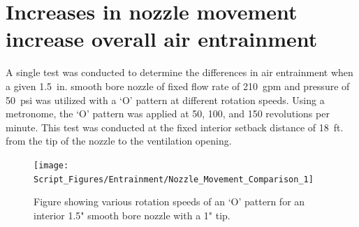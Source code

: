 \documentclass[12pt,oneside]{book}
\begin{document}




\section{Increases in nozzle movement increase overall air entrainment}

A single test was conducted to determine the differences in air entrainment when a given 1.5~in. smooth bore nozzle of fixed flow rate of 210~gpm and pressure of 50~psi was utilized with a `O' pattern at different rotation speeds. Using a metronome, the `O' pattern was applied at 50, 100, and 150 revolutions per minute. This test was conducted at the fixed interior setback distance of 18~ft. from the tip of the nozzle to the ventilation opening.

\begin{figure}[!ht]
	\centering
	\texttt{[image: Script\_Figures/Entrainment/Nozzle\_Movement\_Comparison\_1]}
	\caption{Figure showing various rotation speeds of an `O' pattern for an interior 1.5" smooth bore nozzle with a 1" tip.}
	\label{fig:1_5_Interior_Nozzle_Movement_RotationSpeed_Comparison}
\end{figure}
\end{document}
